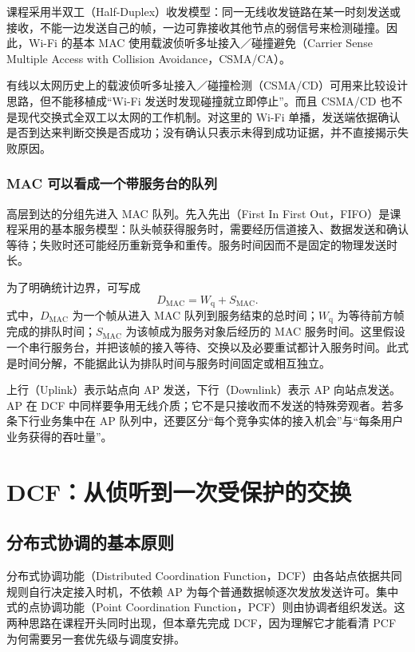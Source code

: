课程采用半双工（Half-Duplex）收发模型：同一无线收发链路在某一时刻发送或接收，不能一边发送自己的帧，一边可靠接收其他节点的弱信号来检测碰撞。因此，Wi-Fi 的基本 MAC 使用载波侦听多址接入／碰撞避免（Carrier Sense Multiple Access with Collision Avoidance，CSMA/CA）。

有线以太网历史上的载波侦听多址接入／碰撞检测（CSMA/CD）可用来比较设计思路，但不能移植成“Wi-Fi 发送时发现碰撞就立即停止”。而且 CSMA/CD 也不是现代交换式全双工以太网的工作机制。对这里的 Wi-Fi 单播，发送端依据确认是否到达来判断交换是否成功；没有确认只表示未得到成功证据，并不直接揭示失败原因。

\subsubsection{MAC 可以看成一个带服务台的队列}

高层到达的分组先进入 MAC 队列。先入先出（First In First Out，FIFO）是课程采用的基本服务模型：队头帧获得服务时，需要经历信道接入、数据发送和确认等待；失败时还可能经历重新竞争和重传。服务时间因而不是固定的物理发送时长。

为了明确统计边界，可写成
\begin{equation}
D_{\mathrm{MAC}}=W_{\mathrm{q}}+S_{\mathrm{MAC}}.
\label{eq:mac-delay}
\end{equation}
式中，$D_{\mathrm{MAC}}$ 为一个帧从进入 MAC 队列到服务结束的总时间；$W_{\mathrm{q}}$ 为等待前方帧完成的排队时间；$S_{\mathrm{MAC}}$ 为该帧成为服务对象后经历的 MAC 服务时间。这里假设一个串行服务台，并把该帧的接入等待、交换以及必要重试都计入服务时间。此式是时间分解，不能据此认为排队时间与服务时间固定或相互独立。

上行（Uplink）表示站点向 AP 发送，下行（Downlink）表示 AP 向站点发送。AP 在 DCF 中同样要争用无线介质；它不是只接收而不发送的特殊旁观者。若多条下行业务集中在 AP 队列中，还要区分“每个竞争实体的接入机会”与“每条用户业务获得的吞吐量”。

\section{DCF：从侦听到一次受保护的交换}
\label{ch:dcf-exchange}

\subsection{分布式协调的基本原则}

分布式协调功能（Distributed Coordination Function，DCF）由各站点依据共同规则自行决定接入时机，不依赖 AP 为每个普通数据帧逐次发放发送许可。集中式的点协调功能（Point Coordination Function，PCF）则由协调者组织发送。这两种思路在课程开头同时出现，但本章先完成 DCF，因为理解它才能看清 PCF 为何需要另一套优先级与调度安排。

